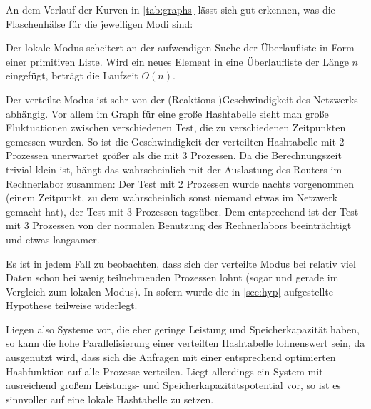 \documentclass{scrreprt}
\begin{document}
An dem Verlauf der Kurven in \autoref{tab:graphs} lässt sich gut erkennen, was die Flaschenhälse für die jeweiligen Modi sind:\medskip

Der lokale Modus scheitert an der aufwendigen Suche der Überlaufliste in Form einer primitiven Liste. Wird ein neues Element in eine Überlaufliste der Länge $n$ eingefügt, beträgt die Laufzeit $O(n)$.

Der verteilte Modus ist sehr von der (Reaktions-)Geschwindigkeit des Netzwerks abhängig. Vor allem im Graph für eine große Hashtabelle sieht man große Fluktuationen zwischen verschiedenen Test, die zu verschiedenen Zeitpunkten gemessen wurden. So ist die Geschwindigkeit der verteilten Hashtabelle mit 2 Prozessen unerwartet größer als die mit 3 Prozessen. Da die Berechnungszeit trivial klein ist, hängt das wahrscheinlich mit der Auslastung des Routers im Rechnerlabor zusammen: Der Test mit 2 Prozessen wurde nachts vorgenommen (einem Zeitpunkt, zu dem wahrscheinlich sonst niemand etwas im Netzwerk gemacht hat), der Test mit 3 Prozessen tagsüber. Dem entsprechend ist der Test mit 3 Prozessen von der normalen Benutzung des Rechnerlabors beeinträchtigt und etwas langsamer. 
\bigskip

Es ist in jedem Fall zu beobachten, dass sich der verteilte Modus bei relativ viel Daten schon bei wenig teilnehmenden Prozessen lohnt (sogar und gerade im Vergleich zum lokalen Modus). In sofern wurde die in \autoref{sec:hyp} aufgestellte Hypothese teilweise widerlegt.\bigskip

Liegen also Systeme vor, die eher geringe Leistung und Speicherkapazität haben, so kann die hohe Parallelisierung einer verteilten Hashtabelle lohnenswert sein, da ausgenutzt wird, dass sich die Anfragen mit einer entsprechend optimierten Hashfunktion auf alle Prozesse verteilen. Liegt allerdings ein System mit ausreichend großem Leistungs- und Speicherkapazitätspotential vor, so ist es sinnvoller auf eine lokale Hashtabelle zu setzen.

\end{document}
